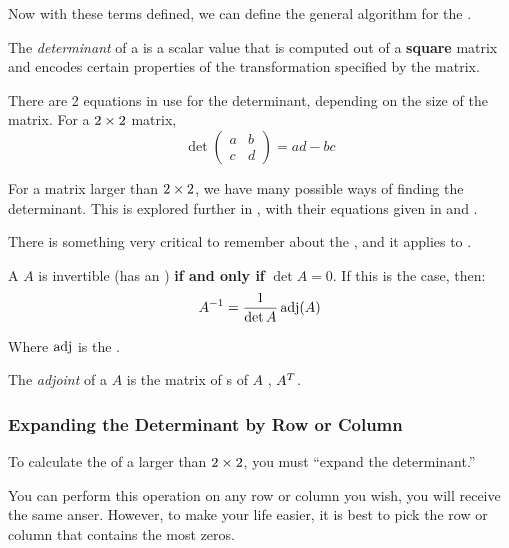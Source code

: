 Now with these terms defined, we can define the general algorithm for the .

\begin{definition}[Determinant]\label{def:Determinant}
  The \emph{determinant} of a  is a scalar value that is computed out of a \textbf{square} matrix and encodes certain properties of the transformation specified by the matrix.

  There are 2 equations in use for the determinant, depending on the size of the matrix.
  For a $2 \times 2$ matrix,
  \begin{equation}\label{eq:Determinant_2x2}
    \det
    \begin{pmatrix}
      a & b \\
      c & d
    \end{pmatrix}
    = ad - bc
  \end{equation}

  For a matrix larger than $2 \times 2$, we have many possible ways of finding the determinant.
  This is explored further in , with their equations given in  and .
\end{definition}

There is something very critical to remember about the , and it applies to .
\begin{theorem}\label{thm:Determinant_Invertible_Matrix}
  A  $A$ is invertible (has an ) \textbf{if and only if} $\det A = 0$.
  If this is the case, then:
  \begin{equation}\label{eq:Inverse_by_Determinant}
    A^{-1} = \frac{1}{\det A} \operatorname{adj}(A)
  \end{equation}

  Where $\operatorname{adj}$ is the .
\end{theorem}

\begin{definition}[Adjoint]\label{def:Adjoint}
  The \emph{adjoint} of a  $A$ is the matrix of s of $A$ , ${A}^{T}$.
\end{definition}

\subsubsection{Expanding the Determinant by Row or Column}\label{subsubsec:Expand_Determinant}
To calculate the  of a  larger than $2 \times 2$, you must ``expand the determinant.''

\begin{remark*}
  You can perform this operation on any row or column you wish, you will receive the same anser.
  However, to make your life easier, it is best to pick the row or column that contains the most zeros.
\end{remark*}


